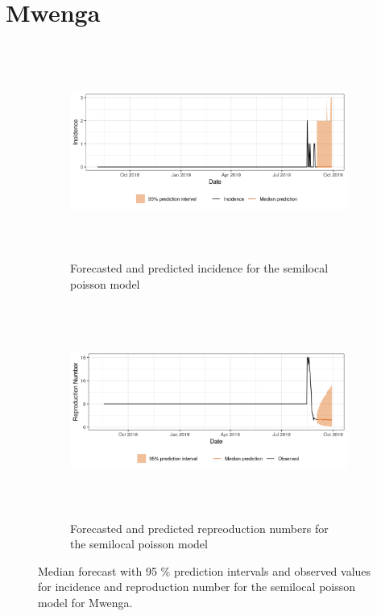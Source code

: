  \section{ Mwenga }\begin{figure}[H]\begin{subfigure}{\textwidth}  \centering  \includegraphics[width=0.9\linewidth, height=7cm]{../output/Mwenga_predictions.png}  \caption{Forecasted and predicted incidence for the semilocal poisson model}\end{subfigure}

\begin{subfigure}{\textwidth}  \centering  \includegraphics[width=0.9\linewidth, height=7cm]{../output/Mwenga_Rs.png}  \caption{Forecasted and predicted repreoduction numbers for the semilocal poisson model}\end{subfigure}  \caption{Median forecast with 95 \% prediction intervals and observed values for incidence and reproduction number for the semilocal poisson model for Mwenga.}\end{figure}

